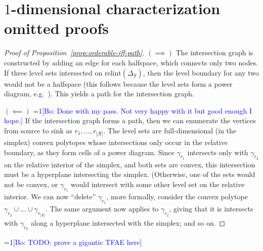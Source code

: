 \documentclass[anon]{colt2020} %
\newcommand{\Comments}{1}
\newcommand{\mynote}[2]{\ifnum\Comments=1\textcolor{#1}{#2}\fi}
\newcommand{\bo}[1]{\mynote{blue}{[Bo: #1]}}
\newcommand{\relint}{\mathrm{relint}}
\newcommand{\simplex}{\Delta_\Y}
\newcommand{\R}{\mathcal{R}}
\newcommand{\Y}{\mathcal{Y}}
\begin{document}


\newpage
\appendix

\section{$1$-dimensional characterization omitted proofs}\label{app:1-dim}

\begin{proof}[Proof of Proposition~\ref{prop:orderable-iff-path}]
	$(\implies)$
	The intersection graph is constructed by adding an edge for each halfspace, which connects only two nodes.
	If three level sets intersected on $\relint(\simplex)$, then the level boundary for any two would not be a halfspace (this follows because the level sets form a power diagram, e.g.~\cite{lambert2009eliciting}).
	This yields a path for the intersection graph.
	
	
	$(\impliedby)$
	\bo{Done with my pass. Not very happy with it but good enough I hope.}
	If the intersection graph forms a path, then we can enumerate the vertices from source to sink as $r_1,\ldots,r_{|\R|}$.
	The level sets are full-dimensional (in the simplex) convex polytopes whose intersections only occur in the relative boundary, as they form cells of a power diagram.
	Since $\gamma_{r_1}$ intersects only with $\gamma_{r_2}$ on the relative interior of the simplex, and both sets are convex, this intersection must be a hyperplane intersecting the simplex.
	(Otherwise, one of the sets would not be convex, or $\gamma_{r_1}$ would intersect with some other level set on the relative interior.
	We can now ``delete'' $\gamma_{r_1}$, more formally, consider the convex polytope $\gamma_{r_2} \cup \ldots \cup \gamma_{r_{|\R|}}$.
	The same argument now applies to $\gamma_{r_2}$, giving that it is intersects with $\gamma_{r_3}$ along a hyperplane intersected with the simplex; and so on.
\end{proof}

\bo{TODO: prove a gigantic TFAE here}
\end{document}
